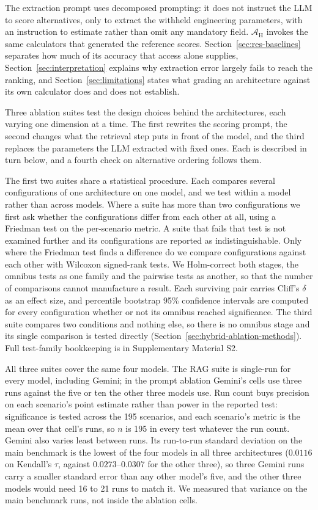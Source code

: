 \documentclass[final,3p,times]{elsarticle}
\begin{document}
The extraction prompt uses decomposed prompting: it does not instruct the LLM to score alternatives, only to extract the withheld engineering parameters, with an instruction to estimate rather than omit any mandatory field. $\mathcal{A}_{\text{H}}$ invokes the same calculators that generated the reference scores. Section~\ref{sec:res-baselines} separates how much of its accuracy that access alone supplies, Section~\ref{sec:interpretation} explains why extraction error largely fails to reach the ranking, and Section~\ref{sec:limitations} states what grading an architecture against its own calculator does and does not establish.

Three ablation suites test the design choices behind the architectures, each varying one dimension at a time. The first rewrites the scoring prompt, the second changes what the retrieval step puts in front of the model, and the third replaces the parameters the LLM extracted with fixed ones. Each is described in turn below, and a fourth check on alternative ordering follows them.

The first two suites share a statistical procedure. Each compares several configurations of one architecture on one model, and we test within a model rather than across models. Where a suite has more than two configurations we first ask whether the configurations differ from each other at all, using a Friedman test on the per-scenario metric. A suite that fails that test is not examined further and its configurations are reported as indistinguishable. Only where the Friedman test finds a difference do we compare configurations against each other with Wilcoxon signed-rank tests. We Holm-correct both stages, the omnibus tests as one family and the pairwise tests as another, so that the number of comparisons cannot manufacture a result. Each surviving pair carries Cliff's $\delta$ as an effect size, and percentile bootstrap 95\% confidence intervals are computed for every configuration whether or not its omnibus reached significance. The third suite compares two conditions and nothing else, so there is no omnibus stage and its single comparison is tested directly (Section~\ref{sec:hybrid-ablation-methods}). Full test-family bookkeeping is in Supplementary Material S2.

All three suites cover the same four models. The RAG suite is single-run for every model, including Gemini; in the prompt ablation Gemini's cells use three runs against the five or ten the other three models use. Run count buys precision on each scenario's point estimate rather than power in the reported test: significance is tested across the 195 scenarios, and each scenario's metric is the mean over that cell's runs, so $n$ is 195 in every test whatever the run count. Gemini also varies least between runs. Its run-to-run standard deviation on the main benchmark is the lowest of the four models in all three architectures ($0.0116$ on Kendall's $\tau$, against $0.0273$--$0.0307$ for the other three), so three Gemini runs carry a smaller standard error than any other model's five, and the other three models would need 16 to 21 runs to match it. We measured that variance on the main benchmark runs, not inside the ablation cells.
\end{document}
